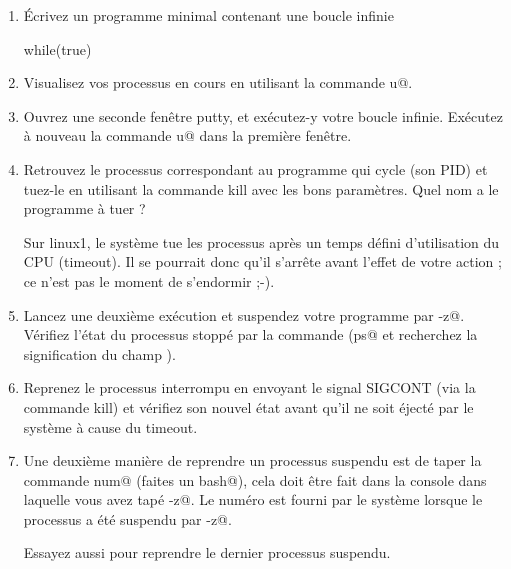 \documentclass[11pt,a4paper]{article}
\begin{document}
					\begin{enumerate}
				
			\item 
						\'Ecrivez un programme minimal 
						contenant une boucle infinie
						\begin{Java}
	while(true){}
						\end{Java}
			\item 
						Visualisez vos processus en cours en utilisant la commande 
						\verb@ps u@.
					
			\item 
						Ouvrez une seconde fen\^etre putty, et ex\'ecutez-y 
						votre boucle infinie.
						Ex\'ecutez \`a nouveau la commande 
						\verb@ps u@
						dans la premi\`ere fen\^etre.
					
			\item 
						Retrouvez le processus correspondant au programme 
						qui cycle (son PID)
						et tuez-le en utilisant la commande kill
						avec les bons param\`etres. Quel nom a le programme \`a tuer ?
						
            \par
        
						Sur linux1,
						le syst\`eme tue les processus apr\`es un temps d\'efini
						d'utilisation du CPU (timeout). Il se pourrait donc
						qu'il s'arr\^ete avant l'effet de votre action ;
						ce n'est pas le moment de s'endormir ;-).
						
            \par
        
			\item 
						Lancez une deuxi\`eme ex\'ecution et suspendez votre programme 
						par \verb@Ctrl-z@.
						V\'erifiez l'\'etat du processus stopp\'e par la commande 
						\verb@ps@
						(\verb@man ps@ et recherchez 
						la signification du champ 
						\verb@STAT@).
					
			\item 
						Reprenez le processus interrompu en envoyant le signal 
						SIGCONT (via la commande kill) 
						et v\'erifiez son nouvel \'etat avant qu'il ne soit \'eject\'e par 
						le syst\`eme \`a cause du \guillemotleft timeout\guillemotright .
					
			\item 
						Une deuxi\`eme mani\`ere de reprendre un processus suspendu
						est de taper la commande
						\verb@fg num@ 
						(faites un \verb@man bash@),
						cela doit \^etre fait dans la console dans laquelle vous 
						avez tap\'e \verb@Ctrl-z@.
						Le num\'ero \verb@num@
						est fourni par le syst\`eme lorsque le processus 
						a \'et\'e suspendu par \verb@Ctrl-z@.
						
            \par
        
						Essayez aussi \verb@fg@ 
						pour reprendre le dernier processus suspendu.
						
            \par
        
					\end{enumerate}
\end{document}
